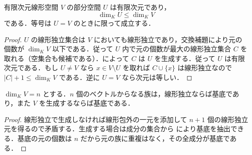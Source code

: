 \begin{prop}[部分空間の次元]
有限次元線形空間 $V$ の部分空間 $U$ は有限次元であり，
\[
 \dim_K U\leq\dim_K V
\]
である．等号は $U=V$ のときに限って成立する．
\end{prop}
\begin{proof}
$U$ の線形独立集合は $V$ においても線形独立であり，交換補題により元の個数が $\dim_K V$ 以下である．従って $U$ 内で元の個数が最大の線形独立集合 $C$ を取れる（空集合も候補である）．によって $C$ は $U$ を生成する．従って $U$ は有限次元である．もし $U\ne V$ なら $x\in V\setminus U$ を取れば $C\cup\{x\}$ は線形独立なので $|C|+1\leq\dim_K V$ である．逆に $U=V$ なら次元は等しい．
\end{proof}
\begin{prop}[基底の次元による判定]
$\dim_K V=n$ とする．$n$ 個のベクトルからなる族は，線形独立ならば基底であり，また $V$ を生成するならば基底である．
\end{prop}
\begin{proof}
線形独立で生成しなければ線形包外の一元を添加して $n+1$ 個の線形独立元を得るので矛盾する．生成する場合は成分の集合から により基底を抽出できる．基底の元の個数は $n$ だから元の族に重複はなく，その全成分が基底である．
\end{proof}
